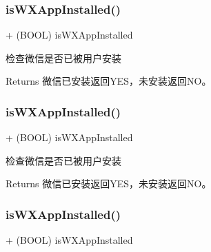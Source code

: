 \subsubsection{\texorpdfstring{is\+W\+X\+App\+Installed()}{isWXAppInstalled()}\hspace{0.1cm}{\footnotesize\ttfamily [1/3]}}
{\footnotesize\ttfamily + (B\+O\+OL) is\+W\+X\+App\+Installed \begin{DoxyParamCaption}{ }\end{DoxyParamCaption}}



检查微信是否已被用户安装 

\begin{DoxyReturn}{Returns}
微信已安装返回\+Y\+E\+S，未安装返回\+N\+O。 
\end{DoxyReturn}
\mbox{\label{interface_w_x_api_a3684676bea249fdd0708a38ee74f0604}} 
\subsubsection{\texorpdfstring{is\+W\+X\+App\+Installed()}{isWXAppInstalled()}\hspace{0.1cm}{\footnotesize\ttfamily [2/3]}}
{\footnotesize\ttfamily + (B\+O\+OL) is\+W\+X\+App\+Installed \begin{DoxyParamCaption}{ }\end{DoxyParamCaption}}



检查微信是否已被用户安装 

\begin{DoxyReturn}{Returns}
微信已安装返回\+Y\+E\+S，未安装返回\+N\+O。 
\end{DoxyReturn}
\mbox{\label{interface_w_x_api_a3684676bea249fdd0708a38ee74f0604}} 
\subsubsection{\texorpdfstring{is\+W\+X\+App\+Installed()}{isWXAppInstalled()}\hspace{0.1cm}{\footnotesize\ttfamily [3/3]}}
{\footnotesize\ttfamily + (B\+O\+OL) is\+W\+X\+App\+Installed \begin{DoxyParamCaption}{ }\end{DoxyParamCaption}}



